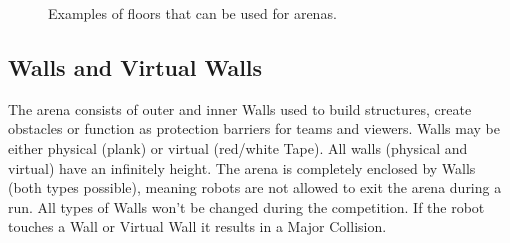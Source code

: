 \begin{figure} [h!]
\begin{center}
		 \hspace{0.1cm}
		 \hspace{0.1cm}
		 \hspace{0.1cm}
		 \hspace{0.1cm}
	\end{center}
	\caption{Examples of floors that can be used for \RCAW arenas.}
	\label{fig:example_floors}
\end{figure}



\subsection{Walls and Virtual Walls}
\label{subsec: Walls and virtual Walls}

The arena consists of outer and inner Walls used to build structures, create obstacles or function as protection barriers for teams and viewers. Walls may be either physical (plank) or virtual (red/white Tape). All walls (physical and virtual) have an infinitely height.
The arena is completely enclosed by Walls (both types possible), meaning robots are not allowed to exit the arena during a run. All types of Walls won't be changed during the competition. If the robot touches a Wall or Virtual Wall it results in a Major Collision.

